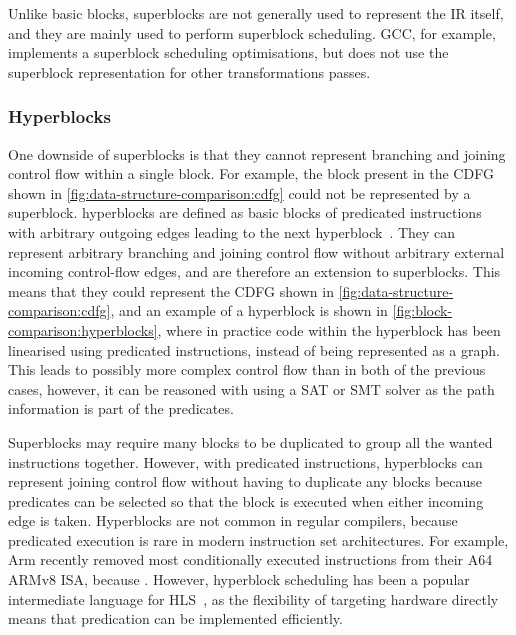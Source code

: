 Unlike \glspl{basic block}, \glspl{superblock} are not generally used to
represent the \gls{IR} itself, and they are mainly used to perform superblock
scheduling.  GCC, for example, implements a superblock scheduling optimisations,
but does not use the superblock representation for other transformations passes.

\subsubsection{Hyperblocks}

One downside of \glspl{superblock} is that they cannot represent branching and
joining control flow within a single block.  For example, the block present in
the \gls{CDFG} shown in \cref{fig:data-structure-comparison:cdfg} could not be
represented by a \gls{superblock}.  \Glspl{hyperblock} are defined as
\glspl{basic block} of \glspl{predicated instruction} with arbitrary outgoing
edges leading to the next
hyperblock~\cite[]{mahlke92_effec_compil_suppor_predic_execut_using_hyper}.
They can represent arbitrary branching and joining control flow without
arbitrary external incoming control-flow edges, and are therefore an extension
to \glspl{superblock}.  This means that they could represent the \gls{CDFG}
shown in \cref{fig:data-structure-comparison:cdfg}, and an example of a
hyperblock is shown in \cref{fig:block-comparison:hyperblocks}, where in
practice code within the \gls{hyperblock} has been linearised using predicated
instructions, instead of being represented as a graph.  This leads to possibly
more complex control flow than in both of the previous cases, however, it can be
reasoned with using a \gls{SAT} or \gls{SMT} solver as the path information is
part of the predicates.

Superblocks may require many blocks to be duplicated to group all the wanted
instructions together.  However, with predicated instructions, hyperblocks can
represent joining control flow without having to duplicate any blocks because
predicates can be selected so that the block is executed when either incoming
edge is taken.  Hyperblocks are not common in regular compilers, because
predicated execution is rare in modern instruction set architectures.  For
example, Arm recently removed most conditionally executed instructions from
their A64 ARMv8 ISA, because .  However, hyperblock scheduling has been a popular
intermediate language for \gls{HLS}~\cite{budiu02_compil_applic_specif_hardw,
  callahan98_instr_level_paral_recon_comput}, as the flexibility of targeting
hardware directly means that predication can be implemented efficiently.

